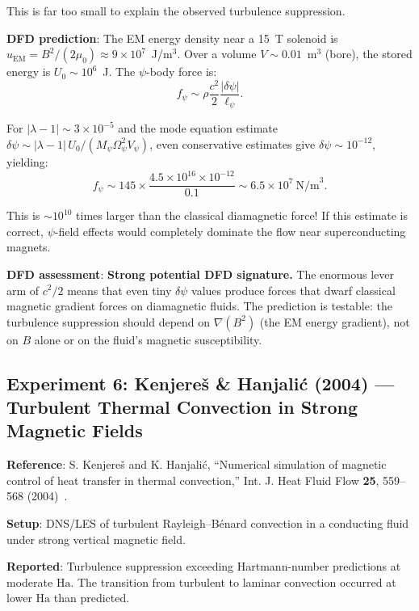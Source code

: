 \documentclass[12pt,twocolumn]{article}
\newcommand{\Ha}{\mathrm{Ha}}
\newcommand{\dpsi}{\delta\psi}
\begin{document}
This is far too small to explain the observed turbulence suppression.

\textbf{DFD prediction}: The EM energy density near a 15~T solenoid is
$u_\mathrm{EM} = B^2/(2\mu_0) \approx 9\times10^7$~J/m$^3$. Over a
volume $V \sim 0.01$~m$^3$ (bore), the stored energy is $U_0 \sim
10^6$~J. The $\psi$-body force is:
\begin{equation}
f_\psi \sim \rho\frac{c^2}{2}\frac{|\dpsi|}{\ell_\psi}.
\end{equation}

For $|\lambda - 1| \sim 3\times10^{-5}$ and the mode equation
estimate $\dpsi \sim |\lambda-1|\,U_0/(M_\psi\Omega_\psi^2 V_\psi)$,
even conservative estimates give $\dpsi \sim 10^{-12}$, yielding:
\begin{equation}
f_\psi \sim 145\times\frac{4.5\times10^{16}\times10^{-12}}{0.1}
\sim 6.5\times10^{7}~\mathrm{N/m}^3.
\end{equation}

This is $\sim 10^{10}$ times larger than the classical diamagnetic force!
If this estimate is correct, $\psi$-field effects would completely dominate
the flow near superconducting magnets.

\textbf{DFD assessment}: \textbf{Strong potential DFD signature.} The
enormous lever arm of $c^2/2$ means that even tiny $\dpsi$ values produce
forces that dwarf classical magnetic gradient forces on diamagnetic fluids.
The prediction is testable: the turbulence suppression should depend on
$\nabla(B^2)$ (the EM energy gradient), not on $B$ alone or on the
fluid's magnetic susceptibility.

\subsection{Experiment 6: Kenjere\v{s} \& Hanjali\'{c} (2004) ---
Turbulent Thermal Convection in Strong Magnetic Fields}

\textbf{Reference}: S. Kenjere\v{s} and K. Hanjali\'{c}, ``Numerical
simulation of magnetic control of heat transfer in thermal convection,''
Int. J. Heat Fluid Flow \textbf{25}, 559--568 (2004)~\cite{kenjeres2004}.

\textbf{Setup}: DNS/LES of turbulent Rayleigh--B\'enard convection in
a conducting fluid under strong vertical magnetic field.

\textbf{Reported}: Turbulence suppression exceeding Hartmann-number
predictions at moderate $\Ha$. The transition from turbulent to laminar
convection occurred at lower $\Ha$ than predicted.
\end{document}

